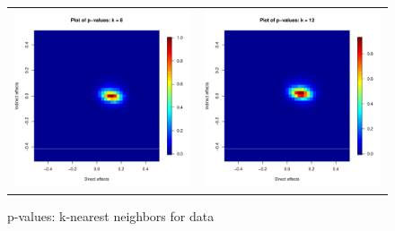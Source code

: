 \documentclass[12pt]{article}
\begin{document}
\begin{figure}
\begin{tabular}{cc}
	\includegraphics[scale=0.45]{./images/pvalues_figure_8nn_Bergan.pdf} &
	\includegraphics[scale=0.45]{./images/pvalues_figure_12nn_Bergan.pdf} \\ 
	\end{tabular}
	\caption{p-values: k-nearest neighbors for \citet{bergan2015call} data}
\end{figure}
\end{document}
